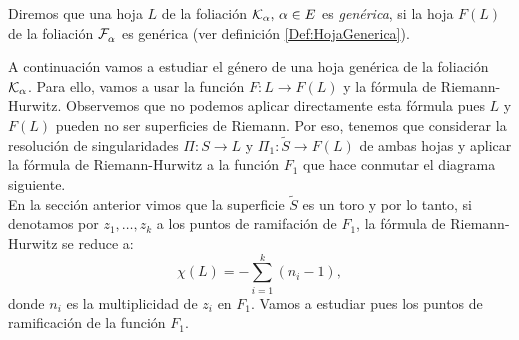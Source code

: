 \begin{defn}
\label{Def:HojaKGenerica}
Diremos que una hoja $L$ de la foliación $\mathcal{K}_{\alpha},\, \alpha\in E$ es \emph{genérica}, si la hoja $F(L)$ de la foliación $\mathcal{F}^{\ }_{\alpha}$ es genérica (ver definición \ref{Def:HojaGenerica}). 
\end{defn}

A continuación vamos a estudiar el género de una hoja genérica de la foliación $\mathcal{K}_{\alpha}$. Para ello, vamos a usar la función $F\colon L\rightarrow F(L)$ y la fórmula de Riemann-Hurwitz. Observemos que no podemos aplicar directamente esta fórmula pues $L$ y $F(L)$ pueden no ser superficies de Riemann. Por eso, tenemos que considerar la resolución de singularidades $\Pi\colon S\rightarrow L$ y $\Pi_{1}\colon \tilde{S}\rightarrow F(L)$ de ambas hojas y aplicar la fórmula de Riemann-Hurwitz a la función $F_{1}$ que hace conmutar el diagrama siguiente.\\

En la sección anterior vimos que la superficie $\tilde{S}$ es un toro y por lo tanto, si denotamos por $z_{1},\ldots,z_{k}$ a los puntos de ramifación de $F_{1}$, la fórmula de Riemann-Hurwitz se reduce a:
\begin{equation}
\label{For:RiemannToro}
\chi(L)=-\sum_{i=1}^{k}(n_{i}-1),
\end{equation}
\noindent donde $n_{i}$ es la multiplicidad de $z_{i}$ en $F_{1}$. Vamos a estudiar pues los puntos de ramificación de la función $F_{1}$.\\

